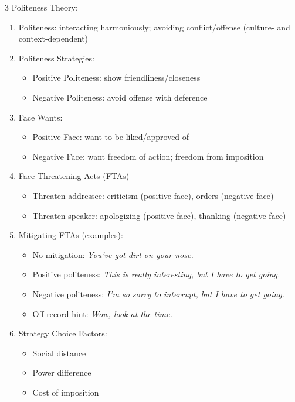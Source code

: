 \documentclass[12pt, a4paper]{article}
\begin{document}
\begin{multicols*}{3}
Politeness Theory:
\begin{enumerate}[\roman*.]
  \item Politeness: interacting harmoniously; avoiding conflict/offense (culture- and context-dependent)
  \item Politeness Strategies:
    \begin{itemize}[leftmargin=*]\vspace{3pt}
      \item Positive Politeness: show friendliness/closeness
      \item Negative Politeness: avoid offense with deference 
    \end{itemize}
  \item Face Wants:
    \begin{itemize}[leftmargin=*]\vspace{3pt}
      \item Positive Face: want to be liked/approved of
      \item Negative Face: want freedom of action; freedom from imposition
    \end{itemize}
  \item Face-Threatening Acts (FTAs)
    \begin{itemize}[leftmargin=*]\vspace{3pt}
      \item Threaten addressee: criticism (positive face), orders (negative face)
      \item Threaten speaker: apologizing (positive face), thanking (negative face)
    \end{itemize}
  \item Mitigating FTAs (examples):
    \begin{itemize}[leftmargin=*]\vspace{3pt}
      \item No mitigation: \textit{You've got dirt on your nose.}
      \item Positive politeness: \textit{This is really interesting, but I have to get going.}
      \item Negative politeness: \textit{I'm so sorry to interrupt, but I have to get going.}
      \item Off-record hint: \textit{Wow, look at the time.}
    \end{itemize}
  \item Strategy Choice Factors:
    \begin{itemize}[leftmargin=*]\vspace{3pt}
      \item Social distance
      \item Power difference
      \item Cost of imposition
    \end{itemize}
\end{enumerate}
\colbreak

\end{multicols*}
\end{document}
